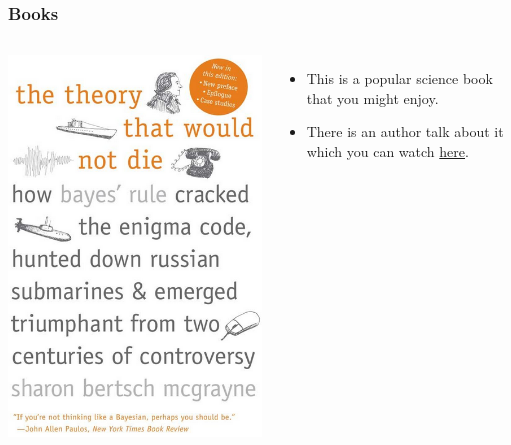 \documentclass{beamer}
\begin{document}
\begin{frame}
\frametitle{Books}

    \begin{columns} %
        \includegraphics[width=0.7\linewidth]{images/theory.png}

        \begin{itemize}
        \item This is a popular science book that you might enjoy.\pause
        \item There is an author talk about it which you can watch
            \href{https://www.youtube.com/watch?v=8oD6eBkjF9o}{here}.
        \end{itemize}
     \end{columns}

\end{frame}
\end{document}
